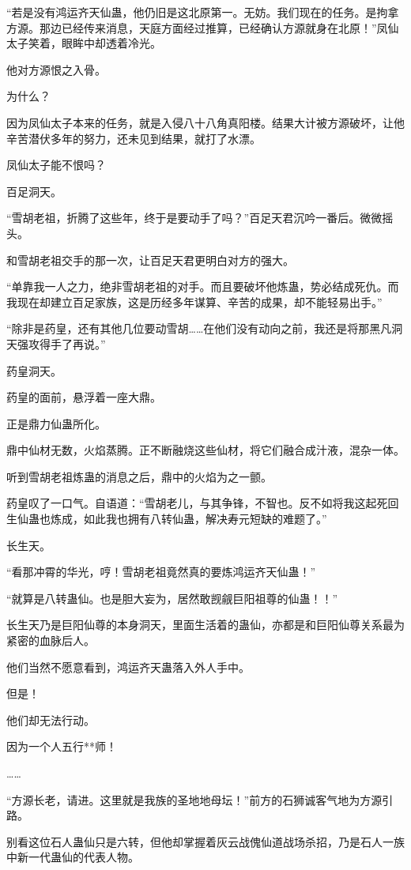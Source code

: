\begin{this_body}
“若是没有鸿运齐天仙蛊，他仍旧是这北原第一。无妨。我们现在的任务。是拘拿方源。那边已经传来消息，天庭方面经过推算，已经确认方源就身在北原！”凤仙太子笑着，眼眸中却透着冷光。

他对方源恨之入骨。

为什么？

因为凤仙太子本来的任务，就是入侵八十八角真阳楼。结果大计被方源破坏，让他辛苦潜伏多年的努力，还未见到结果，就打了水漂。

凤仙太子能不恨吗？

百足洞天。

“雪胡老祖，折腾了这些年，终于是要动手了吗？”百足天君沉吟一番后。微微摇头。

和雪胡老祖交手的那一次，让百足天君更明白对方的强大。

“单靠我一人之力，绝非雪胡老祖的对手。而且要破坏他炼蛊，势必结成死仇。而我现在却建立百足家族，这是历经多年谋算、辛苦的成果，却不能轻易出手。”

“除非是药皇，还有其他几位要动雪胡……在他们没有动向之前，我还是将那黑凡洞天强攻得手了再说。”

药皇洞天。

药皇的面前，悬浮着一座大鼎。

正是鼎力仙蛊所化。

鼎中仙材无数，火焰蒸腾。正不断融烧这些仙材，将它们融合成汁液，混杂一体。

听到雪胡老祖炼蛊的消息之后，鼎中的火焰为之一颤。

药皇叹了一口气。自语道：“雪胡老儿，与其争锋，不智也。反不如将我这起死回生仙蛊也炼成，如此我也拥有八转仙蛊，解决寿元短缺的难题了。”

长生天。

“看那冲霄的华光，哼！雪胡老祖竟然真的要炼鸿运齐天仙蛊！”

“就算是八转蛊仙。也是胆大妄为，居然敢觊觎巨阳祖尊的仙蛊！！”

长生天乃是巨阳仙尊的本身洞天，里面生活着的蛊仙，亦都是和巨阳仙尊关系最为紧密的血脉后人。

他们当然不愿意看到，鸿运齐天蛊落入外人手中。

但是！

他们却无法行动。

因为一个人五行**师！

……

“方源长老，请进。这里就是我族的圣地地母坛！”前方的石狮诚客气地为方源引路。

别看这位石人蛊仙只是六转，但他却掌握着灰云战傀仙道战场杀招，乃是石人一族中新一代蛊仙的代表人物。


\end{this_body}
